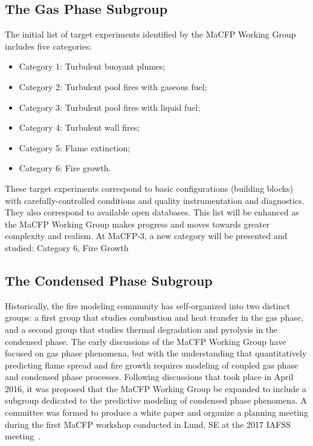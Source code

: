 \documentclass[12pt]{article}
\begin{document}
\subsection{The Gas Phase Subgroup}
The initial list of target experiments identified by the MaCFP Working Group includes five categories:
\begin{itemize}[noitemsep]
 \item Category 1: Turbulent buoyant plumes;
 \item Category 2: Turbulent pool fires with gaseous fuel;
 \item Category 3: Turbulent pool fires with liquid fuel;
 \item Category 4: Turbulent wall fires;
 \item Category 5: Flame extinction;
 \item Category 6: Fire growth.
\end{itemize}
These target experiments correspond to basic configurations (building blocks) with carefully-controlled conditions and quality instrumentation and diagnostics. They also correspond to available open databases. This list will be enhanced as the MaCFP Working Group makes progress and moves towards greater complexity and realism. At MaCFP-3, a new category will be presented and studied: Category 6, Fire Growth

\subsection{The Condensed Phase Subgroup}
Historically, the fire modeling community has self-organized into two distinct groups: a first group that studies combustion and heat transfer in the gas phase, and a second group that studies thermal degradation and pyrolysis in the condensed phase. The early discussions of the MaCFP Working Group have focused on gas phase phenomena, but with the understanding that quantitatively predicting flame spread and fire growth requires modeling of coupled gas phase and condensed phase processes. Following discussions that took place in April 2016, it was proposed that the MaCFP Working Group be expanded to include a subgroup dedicated to the predictive modeling of condensed phase phenomena. A committee was formed to produce a white paper and organize a planning meeting during the first MaCFP workshop conducted in Lund, SE at the 2017 IAFSS meeting~\cite{brown2018proceedings}. 
\end{document}
